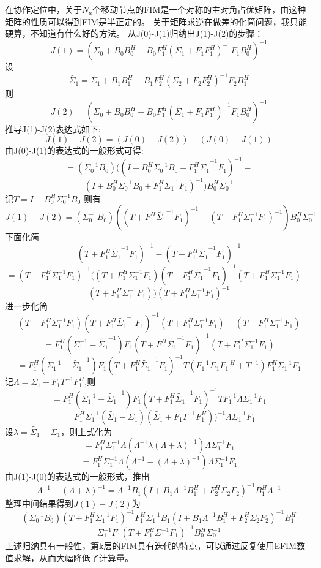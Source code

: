 \documentclass[12pt]{article}
\begin{document}
\title{\textbf{}} 

\author{}
\maketitle
\large
在协作定位中，关于$N_a$个移动节点的FIM是一个对称的主对角占优矩阵，由这种矩阵的性质可以得到FIM是半正定的。
关于矩阵求逆在做差的化简问题，我只能硬算，不知道有什么好的方法。
从J(0)-J(1)归纳出J(1)-J(2)的步骤：
\[
J(1)=(\Sigma_0+B_0B_0^H-B_0F_1^H
(\Sigma_1+F_1F_1^H)^{-1}F_1B_0^H)^{-1}
\]
设
\[
\tilde{\Sigma_1}=\Sigma_1+B_1B_1^H-B_1F_2^H
(\Sigma_2+F_2F_2^H)^{-1}F_2B_1^H
\]
则
\[
J(2)=(\Sigma_0+B_0B_0^H-B_0F_1^H
(\tilde{\Sigma_1}+F_1F_1^H)^{-1}F_1B_0^H)^{-1}
\]
推导J(1)-J(2)表达式如下:
\[
J(1)-J(2)=(J(0)-J(2))-(J(0)-J(1))
\]
由J(0)-J(1)的表达式的一般形式可得:
\[
=(\Sigma_0^{-1}B_0)((I+B_0^H\Sigma_0^{-1}B_0+F_1^H\tilde{\Sigma_1}^{-1}F_1)^{-1}-
\]
\[
(I+B_0^H\Sigma_0^{-1}B_0+F_1^H\Sigma_1^{-1}F_1)^{-1})B_0^H\Sigma_0^{-1}
\]
记$T=I+B_0^H\Sigma_0^{-1}B_0$
则有
\[
J(1)-J(2)=(\Sigma_0^{-1}B_0)((T+F_1^H\tilde{\Sigma_1}^{-1}F_1)^{-1}-(T+F_1^H\Sigma_1^{-1}F_1)^{-1})B_0^H\Sigma_0^{-1}
\]
下面化简
\[
(T+F_1^H\tilde{\Sigma_1}^{-1}F_1)^{-1}-(T+F_1^H\tilde{\Sigma_1}^{-1}F_1)^{-1}
\]
\[
=(T+F_1^H\Sigma_1^{-1}F_1)^{-1}((T+F_1^H\Sigma_1^{-1}F_1)(T+F_1^H\tilde{\Sigma_1}^{-1}F_1)^{-1}
(T+F_1^H\Sigma_1^{-1}F_1)-
\]
\[
(T+F_1^H\Sigma_1^{-1}F_1))(T+F_1^H\Sigma_1^{-1}F_1)^{-1}
\]
进一步化简
\[
(T+F_1^H\Sigma_1^{-1}F_1)(T+F_1^H\tilde{\Sigma_1}^{-1}F_1)^{-1}
(T+F_1^H\Sigma_1^{-1}F_1)-(T+F_1^H\Sigma_1^{-1}F_1)
\]
\[
=F_1^H(\Sigma_1^{-1}-\tilde{\Sigma_1}^{-1})F_1(T+F_1^H\tilde{\Sigma_1}^{-1}F_1)^{-1}(T+F_1^H\Sigma_1^{-1}F_1)
\]
\[
=F_1^H(\Sigma_1^{-1}-\tilde{\Sigma_1}^{-1})F_1(T+F_1^H\tilde{\Sigma_1}^{-1}F_1)^{-1}T(F_1^{-1}\Sigma_1F_1^{-H}+T^{-1})F_1^H\Sigma_1^{-1}F_1
\]
记$\Lambda=\Sigma_1+F_1T^{-1}F_1^H$,则
\[
=F_1^H(\Sigma_1^{-1}-\tilde{\Sigma_1}^{-1})F_1(T+F_1^H\tilde{\Sigma_1}^{-1}F_1)^{-1}TF_1^{-1}\Lambda\Sigma_1^{-1}F_1
\]
\[
=F_1^H\Sigma_1^{-1}(\tilde{\Sigma_1}-\Sigma_1)(\tilde{\Sigma_1}+F_1T^{-1}F_1^H))^{-1}\Lambda\Sigma_1^{-1}F_1
\]
设$\lambda=\tilde{\Sigma_1}-\Sigma_1$，则上式化为
\[
=F_1^H\Sigma_1^{-1}\Lambda(\Lambda^{-1}\lambda(\Lambda+\lambda)^{-1})\Lambda\Sigma_1^{-1}F_1
\]
\[
=F_1^H\Sigma_1^{-1}\Lambda(\Lambda^{-1}-(\Lambda+\lambda)^{-1})\Lambda\Sigma_1^{-1}F_1
\]
由J(1)-J(0)的表达式的一般形式，推出
\[
\Lambda^{-1}-(\Lambda+\lambda)^{-1}=\Lambda^{-1}B_1(I+B_1\Lambda^{-1}B_1^H+F_2^H\Sigma_2F_2)^{-1}B_1^H\Lambda^{-1}
\]
整理中间结果得到$J(1)-J(2)$为
\[
(\Sigma_0^{-1}B_0)(T+F_1^H\Sigma_1^{-1}F_1)^{-1}F_1^H\Sigma_1^{-1}B_1(I+B_1\Lambda^{-1}B_1^H+F_2^H\Sigma_2F_2)^{-1}B_1^H
\]
\[
\Sigma_1^{-1}F_1(T+F_1^H\Sigma_1^{-1}F_1)^{-1}B_0^H\Sigma_0^{-1}
\]
上述归纳具有一般性，第k层的FIM具有迭代的特点，可以通过反复使用EFIM数值求解，从而大幅降低了计算量。
\end{document}
